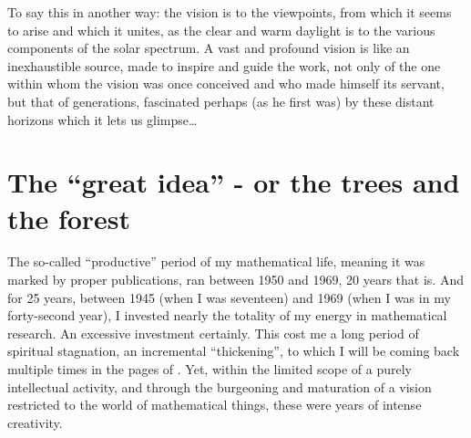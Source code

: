 To say this in another way: the vision is to the viewpoints, 
from which it seems to arise and which it unites,
as the clear and warm daylight is to the various components of the solar spectrum.
A vast and profound vision is like an inexhaustible source, made to inspire and guide the
work, not only of the one within whom the vision was once conceived and who made himself
its servant, but that of generations, fascinated perhaps (as he first was) 
by these distant horizons which it lets us glimpse\ldots

\section{The ``great idea'' - or the trees and the forest}

The so-called 
``productive'' period
of my mathematical life, meaning
it was marked by proper publications, 
ran between 1950 and 1969, 20 years that is. 
And for 25 years, between 1945 (when I was seventeen)
and 1969 (when I was in my forty-second year), I invested nearly the totality of my energy
in mathematical research. 
An excessive investment certainly. 
This cost me a long period of spiritual stagnation, an incremental ``thickening'', to
which I will be coming back multiple times in the pages of \rec.
Yet, within the limited scope of a purely intellectual activity, 
and through the burgeoning and maturation of a vision restricted to the world of
mathematical things, these were years of intense creativity. 


